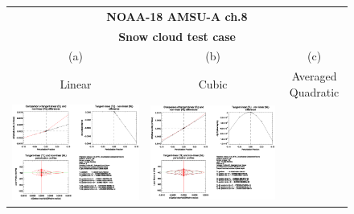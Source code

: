 \begin{figure}[htp]
  \centering
  \begin{tabular}{c c c}
    \multicolumn{3}{c}{\qquad\sffamily\textbf{NOAA-18 AMSU-A ch.8}}\\
    \multicolumn{3}{c}{\qquad\sffamily\textbf{Snow cloud test case}}\\
    \qquad\textsf{(a)} & \qquad\textsf{(b)}  & \qquad\textsf{(c)} \\
    \qquad\textsf{Linear} & \qquad\textsf{Cubic}  & \qquad\textsf{Averaged Quadratic} \\
    \includegraphics[bb=90 400 300 540,clip,scale=0.7]{graphics/Cloud/TL/amsua_n18.ch8.SNOW.NLIN.dOd_dReff.eps} &
    \includegraphics[bb=90 400 300 540,clip,scale=0.7]{graphics/Cloud/TL/amsua_n18.ch8.SNOW.NCUBIC.dOd_dReff.eps} &

\end{tabular}
\end{figure}
